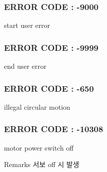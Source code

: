  \subsubsection*{E\-R\-R\-O\-R C\-O\-D\-E \-: -\/9000 }

start user error



 \subsubsection*{E\-R\-R\-O\-R C\-O\-D\-E \-: -\/9999 }

end user error



 \subsubsection*{E\-R\-R\-O\-R C\-O\-D\-E \-: -\/650 }

illegal circular motion



 \subsubsection*{E\-R\-R\-O\-R C\-O\-D\-E \-: -\/10308 }

motor power switch off \begin{DoxyRemark}{Remarks}
서보 off 시 발생 
\end{DoxyRemark}

